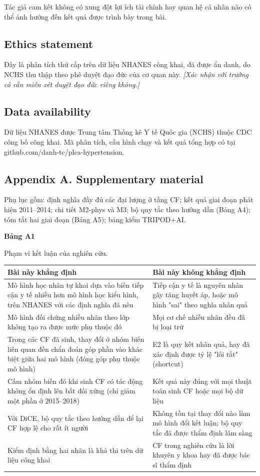 \documentclass[9pt,a4paper]{extarticle}
\newcommand{\tabcap}[2]{{\footnotesize\textbf{Bảng #1}\par\vspace{1pt}#2\par}\vspace{3pt}\scriptsize}
\begin{document}
Tác giả cam kết không có xung đột lợi ích tài chính hay quan hệ cá nhân
nào có thể ảnh hưởng đến kết quả được trình bày trong bài.

\subsection{Ethics statement}

Đây là phân tích thứ cấp trên dữ liệu NHANES công khai, đã được ẩn danh,
do NCHS thu thập theo phê duyệt đạo đức của cơ quan này. \emph{{[}Xác
nhận với trường có cần miễn xét duyệt đạo đức riêng không.{]}}

\subsection{Data availability}

Dữ liệu NHANES được Trung tâm Thống kê Y tế Quốc gia (NCHS) thuộc CDC
công bố công khai. Mã phân tích, cấu hình chạy và kết quả tổng hợp có
tại github.com/danh-tc/plca-hypertension.

\subsection{Appendix A. Supplementary material}

Phụ lục gồm: định nghĩa đầy đủ các đại lượng ở tầng CF; kết quả giai
đoạn phát hiện 2011--2014; chi tiết M2-phys và M3; bộ quy tắc theo hướng
dẫn (Bảng A4); tóm tắt hai giai đoạn (Bảng A5); bảng kiểm TRIPOD+AI.

\begin{table}[h!]
\tabcap{A1}{Phạm vi kết luận của nghiên cứu.}
\begin{tabularx}{\columnwidth}{>{\raggedright\arraybackslash}X>{\raggedright\arraybackslash}X}
\toprule
\textbf{Bài này khẳng định} & \textbf{Bài này không khẳng định} \\ \midrule
Mô hình học nhãn tự khai dựa vào biến tiếp cận y tế nhiều hơn mô hình học kiểu hình, trên NHANES với các định nghĩa đã nêu & Tiếp cận y tế là nguyên nhân gây tăng huyết áp, hoặc mô hình "sai" theo nghĩa nhân quả \\
Mô hình đối chứng nhiễu nhãn theo lớp không tạo ra được mức phụ thuộc đó & Mọi cơ chế nhiễu nhãn đều đã bị loại trừ \\
Trong các CF đã sinh, thay đổi ở nhóm biến liên quan đến chẩn đoán góp phần vào khác biệt giữa hai mô hình (đóng góp phụ thuộc mô hình) & E2 là quy kết nhân quả, hay đã xác định được tỷ lệ "lối tắt" (shortcut) \\
Cấm nhóm biến đó khi sinh CF có tác động không ổn định lên bất đối xứng (chỉ giảm một phần ở 2015–2018) & Kết quả này đúng với mọi thuật toán sinh CF hoặc mọi bộ dữ liệu \\
Với DiCE, bộ quy tắc theo hướng dẫn để lại CF hợp lệ cho rất ít người & Không tồn tại thay đổi nào làm mô hình đổi kết luận; bộ quy tắc đã được thẩm định lâm sàng \\
Kiểm định bằng hai nhãn là khả thi trên dữ liệu công khai & CF trong nghiên cứu là lời khuyên y khoa hay đã được bác sĩ thẩm định \\
\bottomrule
\end{tabularx}
\end{table}
\end{document}
